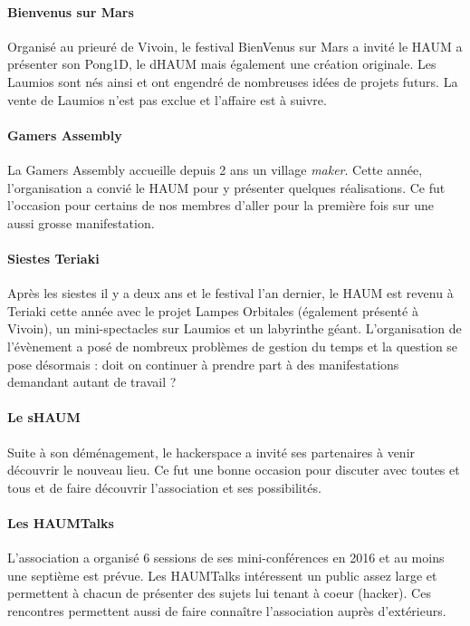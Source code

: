 \documentclass[a4paper, 11pt]{article}
\begin{document}
\paragraph{Bienvenus sur Mars} Organisé au prieuré de Vivoin, le festival BienVenus sur Mars a invité le HAUM a présenter son Pong1D, le dHAUM mais également une création originale. Les Laumios sont nés ainsi et ont engendré de nombreuses idées de projets futurs. La vente de Laumios n'est pas exclue et l'affaire est à suivre.

\paragraph{Gamers Assembly} La Gamers Assembly accueille depuis 2 ans un village \textit{maker}. Cette année, l'organisation a convié le HAUM pour y présenter quelques réalisations. Ce fut l'occasion pour certains de nos membres d'aller pour la première fois sur une aussi grosse manifestation.

\paragraph{Siestes Teriaki} Après les siestes il y a deux ans et le festival l'an dernier, le HAUM est revenu à Teriaki cette année avec le projet Lampes Orbitales (également présenté à Vivoin), un mini-spectacles sur Laumios et un labyrinthe géant. L'organisation de l'évènement a posé de nombreux problèmes de gestion du temps et la question se pose désormais : doit on continuer à prendre part à des manifestations demandant autant de travail ?

\paragraph{Le sHAUM} Suite à son déménagement, le hackerspace a invité ses partenaires à venir découvrir le nouveau lieu. Ce fut une bonne occasion pour discuter avec toutes et tous et de faire découvrir l'association et ses possibilités.

\paragraph{Les HAUMTalks} L'association a organisé 6 sessions de ses mini-conférences en 2016 et au moins une septième est prévue. Les HAUMTalks intéressent un public assez large et permettent à chacun de présenter des sujets lui tenant à coeur (hacker). Ces rencontres permettent aussi de faire connaître l'association auprès d'extérieurs.
\end{document}
